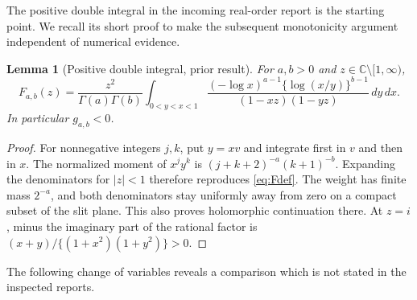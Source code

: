 \documentclass[11pt,a4paper]{article}
\numberwithin{equation}{section}
\newtheorem{lemma}[theorem]{Lemma}
\theoremstyle{definition}
\theoremstyle{remark}
\begin{document}
The positive double integral in the incoming real-order report
\cite{realorder} is the starting point. We recall its short proof to
make the subsequent monotonicity argument independent of numerical evidence.

\begin{lemma}[Positive double integral, prior result]\label{lem:double}
For $a,b>0$ and $z\in\mathbb C\setminus[1,\infty)$,
\begin{equation}\label{eq:double}
 F_{a,b}(z)=\frac{z^2}{\Gamma(a)\Gamma(b)}
 \int_{0<y<x<1}
 \frac{(-\log x)^{a-1}\{\log(x/y)\}^{b-1}}
 {(1-xz)(1-yz)}\,dy\,dx.
\end{equation}
In particular $g_{a,b}<0$.
\end{lemma}
\begin{proof}
For nonnegative integers $j,k$, put $y=xv$ and integrate first in $v$
and then in $x$. The normalized moment of $x^jy^k$ is
$(j+k+2)^{-a}(k+1)^{-b}$. Expanding the denominators for $|z|<1$
therefore reproduces \eqref{eq:Fdef}. The weight has finite mass $2^{-a}$,
and both denominators stay uniformly away from zero on a compact subset
of the slit plane. This also proves holomorphic continuation there.
At $z=i$, minus the imaginary part of the rational factor is
$(x+y)/\{(1+x^2)(1+y^2)\}>0$.
\end{proof}

The following change of variables reveals a comparison which is not
stated in the inspected reports.
\end{document}
